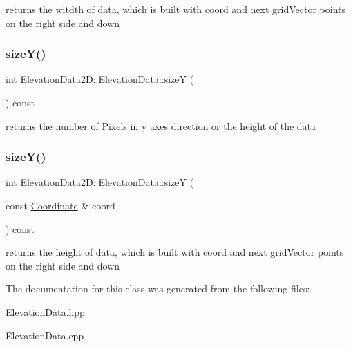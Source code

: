 returns the witdth of data, which is built with coord and next grid\+Vector points on the right side and down \mbox{\label{classElevationData2D_1_1ElevationData_af99f1d5cdcf994d9f8f3cc725f9393c2}} 
\subsubsection{\texorpdfstring{size\+Y()}{sizeY()}\hspace{0.1cm}{\footnotesize\ttfamily [1/2]}}
{\footnotesize\ttfamily int Elevation\+Data2\+D\+::\+Elevation\+Data\+::sizeY (\begin{DoxyParamCaption}{ }\end{DoxyParamCaption}) const}

returns the number of Pixels in y axes direction or the height of the data \mbox{\label{classElevationData2D_1_1ElevationData_a075227f3e6d08be154fe45f7900a3f76}} 
\subsubsection{\texorpdfstring{size\+Y()}{sizeY()}\hspace{0.1cm}{\footnotesize\ttfamily [2/2]}}
{\footnotesize\ttfamily int Elevation\+Data2\+D\+::\+Elevation\+Data\+::sizeY (\begin{DoxyParamCaption}\item[{const \mbox{\hyperlink{classElevationData2D_1_1Coordinate}{Coordinate}} \&}]{coord }\end{DoxyParamCaption}) const}

returns the height of data, which is built with coord and next grid\+Vector points on the right side and down 

The documentation for this class was generated from the following files\+:\begin{DoxyCompactItemize}
\item 
Elevation\+Data.\+hpp\item 
Elevation\+Data.\+cpp\end{DoxyCompactItemize}
